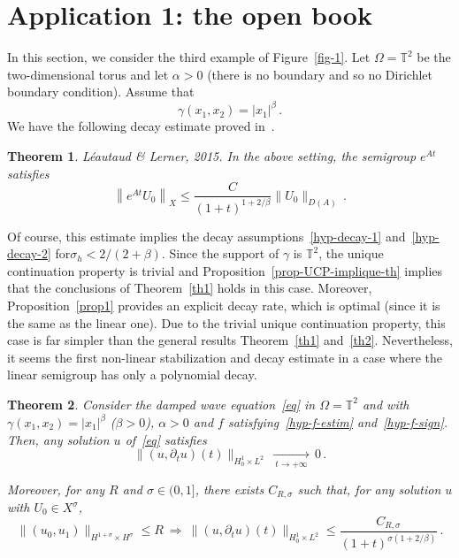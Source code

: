 \documentclass[10pt]{amsart}
\newtheorem{theo}{Theorem}[section]
\theoremstyle{definition}\newtheorem{defi}[theo]{Definition}\newtheorem{rema}[theo]{Remark}\newtheorem{exam}[theo]{Example}\newtheorem{exem}[theo]{Example}\newtheorem{nota}[theo]{Notation}
\newcommand{\TT}{\mathbb{T}}
\begin{document}
\section{Application 1: the open book}\label{section-appli1}

In this section, we consider the third example of Figure~\ref{fig-1}. Let $\Omega=\TT^2$ be the two-dimensional torus and let $\alpha>0$ (there is no boundary and so no Dirichlet boundary condition). Assume that
\[
\gamma(x_1,x_2)=|x_1|^\beta\,.
\]
We have the following decay estimate proved in~\cite[Theorem~1.7]{Leautaud-Lerner}.

\begin{theo}\label{th-Matthieu-Lerner}
\emph{Léautaud \& Lerner, 2015.}
In the above setting, the semigroup $e^{At}$ satisfies
\[
\left\|e^{At} U_0\right\|_X \leq \frac C{(1+t)^{1+2/\beta}} \|U_0\|_{D(A)}\,.
\]
\end{theo}

Of course, this estimate implies the decay assumptions~\eqref{hyp-decay-1} and~\eqref{hyp-decay-2} for\linebreak$\sigma_h < 2/(2+\beta)$. Since the support of $\gamma$ is $\TT^2$, the unique continuation property is trivial and Proposition~\ref{prop-UCP-implique-th} implies that the conclusions of Theorem~\ref{th1} holds in this case. Moreover, Proposition~\ref{prop1} provides an explicit decay rate, which is optimal (since it is the same as the linear one). Due to the trivial unique continuation property, this case is far simpler than the general results Theorem~\ref{th1} and~\ref{th2}. Nevertheless, it seems the first non-linear stabilization and decay estimate in a case where the linear semigroup has only a polynomial decay.

\begin{theo}\label{th-appli1}
Consider the damped wave equation~\eqref{eq} in $\Omega=\TT^2$ and with $\gamma(x_1,x_2)=|x_1|^\beta$ ($\beta>0$), $\alpha>0$ and $f$ satisfying~\eqref{hyp-f-estim} and~\eqref{hyp-f-sign}. Then, any solution $u$ of~\eqref{eq} satisfies
\[
\|(u,\partial_t u)(t)\|_{H^1_0\times L^2}\,\xrightarrow[\:t\longrightarrow
+\infty\:]{}\,0\,.
\]

Moreover, for any $R$ and $\sigma\in (0,1]$, there exists $C_{R,\sigma}$ such that, for any solution $u$ with $U_0\in X^\sigma$,
\[
\|(u_0,u_1)\|_{H^{1+\sigma}\times H^\sigma}\leq
R\:\Longrightarrow\:\|(u,\partial_t u)(t)\|_{H^1_0\times L^2} \leq
\frac{C_{R,\sigma}}{(1+t)^{\sigma(1+2/\beta)}}\,.
\]
\end{theo}
\end{document}
